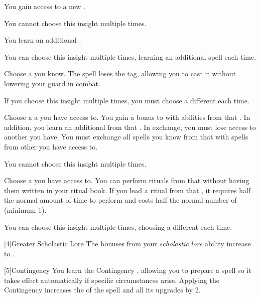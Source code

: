         {
             You gain access to a new .
            \par You cannot choose this insight multiple times.

             You learn an additional .
            \par You can choose this insight multiple times, learning an additional spell each time.

             Choose a  you know.
            The spell loses the  tag, allowing you to cast it without lowering your guard in combat.
            \par If you choose this insight multiple times, you must choose a different  each time.

             Choose a a  you have access to.
            You gain a  bonus to  with abilities from that .
            In addition, you learn an additional  from that .
            In exchange, you must lose access to another  you have.
            You must exchange all spells you know from that  with spells from other  you have access to.
            \par You cannot choose this insight multiple times.

            Choose a  you have access to.
            You can perform rituals from that  without having them written in your ritual book.
            If you lead a ritual from that , it requires half the normal amount of time to perform and costs half the normal number of  (minimum 1).
            \par You can choose this insight multiple times, choosing a different  each time.
        }

        [4]{Greater Scholastic Lore} The bonuses from your \textit{scholastic lore} ability increase to .

        [5]{Contingency}  You learn the Contingency , allowing you to prepare a spell so it takes effect automatically if specific circumstances arise.
        Applying the Contingency  increases the  of the spell and all its upgrades by 2.

